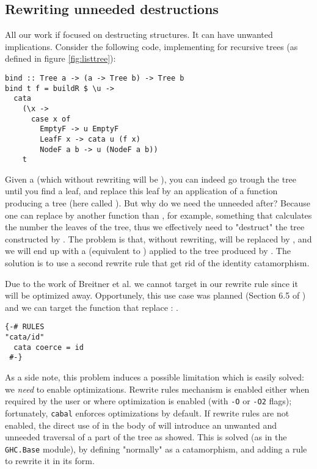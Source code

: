 \subsection{Rewriting unneeded destructions}
\label{sec:bind-def}
All our work if focused on destructing structures. It can have unwanted implications. Consider the following code, implementing  for recursive trees (as defined in figure \ref{fig:listtree}):

\begin{verbatim}
bind :: Tree a -> (a -> Tree b) -> Tree b
bind t f = buildR $ \u ->
  cata
    (\x ->
      case x of
        EmptyF -> u EmptyF
        LeafF x -> cata u (f x)
        NodeF a b -> u (NodeF a b))
    t
\end{verbatim}

\noindent Given a  (which without rewriting will be ), you can indeed go trough the tree until you find a leaf, and replace this leaf by an application of a function producing a tree (here called ). But why do we need the unneeded  after? Because one can replace  by another function than , for example, something that calculates the number the leaves of the tree, thus we effectively need to "destruct" the tree constructed by . The problem is that, without rewriting,  will be replaced by , and we will end up with a  (equivalent to ) applied to the tree produced by . The solution is to use a second rewrite rule that get rid of the identity catamorphism.

Due to the work of Breitner et al. \cite{Breitner:2014:SZC:2692915.2628141} we cannot target  in our rewrite rule since it will be optimized away. Opportunely, this use case was planned (Section 6.5 of \cite{Breitner:2014:SZC:2692915.2628141}) and we can target the function that replace : .

\begin{verbatim}
{-# RULES
"cata/id"
  cata coerce = id
 #-}
\end{verbatim}

\noindent As a side note, this problem induces a possible limitation which is easily solved: we \emph{need} to enable optimizations. Rewrite rules mechanism is enabled either when required by the user or where optimization is enabled (with \verb|-O| or \verb|-O2| flags); fortunately, \verb|cabal| enforces optimizations by default. If rewrite rules are not enabled, the direct use of  in the body of  will introduce an unwanted and unneeded traversal of a part of the tree as showed. This is solved (as in the \verb|GHC.Base| module), by defining "normally"  as a catamorphism, and adding a rule to rewrite it in its  form.


